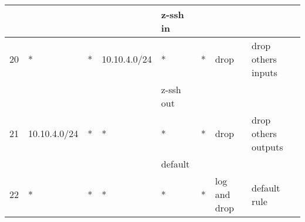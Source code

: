 \documentclass[a4paper, 11pt, oneside]{article}
\begin{document}
\begin{table}[H]
\begin{tabular}{|llllllll|}
                                    &                                      &                                  &                                           & {\color[HTML]{FE0000} z-ssh in}  &                                        &                                      &                     \\ \hline
  \multicolumn{1}{|l|}{20}          & \multicolumn{1}{l|}{*}               & \multicolumn{1}{l|}{*}           & \multicolumn{1}{l|}{10.10.4.0/24}         & \multicolumn{1}{l|}{*}           & \multicolumn{1}{l|}{*}                 & \multicolumn{1}{l|}{drop}            & drop others inputs  \\ \hline
                                    &                                      &                                  &                                           & {\color[HTML]{FE0000} z-ssh out} &                                        &                                      &                     \\ \hline
  \multicolumn{1}{|l|}{21}          & \multicolumn{1}{l|}{10.10.4.0/24}    & \multicolumn{1}{l|}{*}           & \multicolumn{1}{l|}{*}                    & \multicolumn{1}{l|}{*}           & \multicolumn{1}{l|}{*}                 & \multicolumn{1}{l|}{drop}            & drop others outputs \\ \hline
                                    &                                      &                                  &                                           & {\color[HTML]{FE0000} default}   &                                        &                                      &                     \\ \hline
  \multicolumn{1}{|l|}{22}          & \multicolumn{1}{l|}{*}               & \multicolumn{1}{l|}{*}           & \multicolumn{1}{l|}{*}                    & \multicolumn{1}{l|}{*}           & \multicolumn{1}{l|}{*}                 & \multicolumn{1}{l|}{log and drop}    & default rule        \\ \hline
  
  \end{tabular}
\end{table}

\end{document}
